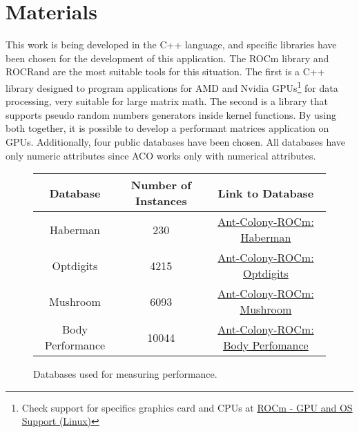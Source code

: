 \section{Materials} \label{Materials}

This work is being developed in the C++ language, and specific libraries have been chosen for the development of this application. The ROCm library\cite{rocm} and ROCRand\cite{rocrand} are the most suitable tools for this situation.
The first is a C++ library designed to program applications for AMD and Nvidia GPUs\footnote[1]{Check support for specifics graphics card and CPUs at \href{https://rocm.docs.amd.com/en/latest/release/gpu_os_support.html}{ROCm - GPU and OS Support (Linux)}} for data processing, very suitable for large matrix math.
The second is a library that supports pseudo random numbers generators inside kernel functions. By using both together, it is possible to develop a performant matrices application on GPUs.
Additionally, four public databases have been chosen. All databases have only numeric attributes since ACO works only with numerical attributes.

\begin{figure}
    \begin{center}
        \begin{tabular}{|c|c|c|}
            \hline
            Database & Number of Instances & Link to Database \\
            \hline
            Haberman & 230 & \href{https://raw.githubusercontent.com/LucasSnatiago/Ant-Colony-ROCm/main/database/haberman_treino_normal.csv}{Ant-Colony-ROCm: Haberman} \\
            \hline
            Optdigits & 4215 & \href{https://raw.githubusercontent.com/LucasSnatiago/Ant-Colony-ROCm/main/database/optdigits_treino_normal.csv}{Ant-Colony-ROCm: Optdigits} \\
            \hline
            Mushroom & 6093 & \href{https://raw.githubusercontent.com/LucasSnatiago/Ant-Colony-ROCm/main/database/mushrooms_treino_normal.csv}{Ant-Colony-ROCm: Mushroom} \\
            \hline
            Body Performance & 10044 & \href{https://raw.githubusercontent.com/LucasSnatiago/Ant-Colony-ROCm/main/database/body_performance_treino_normal.csv}{Ant-Colony-ROCm: Body Perfomance} \\
            \hline
        \end{tabular}
        \caption{Databases used for measuring performance.}
    \end{center}
    \label{fig:datasets}
\end{figure}

